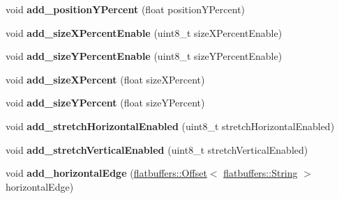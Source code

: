 \begin{DoxyCompactItemize}
\item 
\mbox{\label{structflatbuffers_1_1LayoutComponentTableBuilder_abd7d19f99b737a96a57aceae49f12fbe}} 
void {\bfseries add\+\_\+position\+Y\+Percent} (float position\+Y\+Percent)
\item 
\mbox{\label{structflatbuffers_1_1LayoutComponentTableBuilder_a2535c8654f981da6f901f0518fb7bc49}} 
void {\bfseries add\+\_\+size\+X\+Percent\+Enable} (uint8\+\_\+t size\+X\+Percent\+Enable)
\item 
\mbox{\label{structflatbuffers_1_1LayoutComponentTableBuilder_a4f4e479d2d6c853877d38748edf1cf94}} 
void {\bfseries add\+\_\+size\+Y\+Percent\+Enable} (uint8\+\_\+t size\+Y\+Percent\+Enable)
\item 
\mbox{\label{structflatbuffers_1_1LayoutComponentTableBuilder_a3b6dabe6271d6409d0ef0daeacfba820}} 
void {\bfseries add\+\_\+size\+X\+Percent} (float size\+X\+Percent)
\item 
\mbox{\label{structflatbuffers_1_1LayoutComponentTableBuilder_a88280c4b428c82f0ba8eb1a57093cd2d}} 
void {\bfseries add\+\_\+size\+Y\+Percent} (float size\+Y\+Percent)
\item 
\mbox{\label{structflatbuffers_1_1LayoutComponentTableBuilder_a77836b3399e4634028c04bdde1f626c4}} 
void {\bfseries add\+\_\+stretch\+Horizontal\+Enabled} (uint8\+\_\+t stretch\+Horizontal\+Enabled)
\item 
\mbox{\label{structflatbuffers_1_1LayoutComponentTableBuilder_a0df1cb675e7866e95b3cf8d1f39e8ebb}} 
void {\bfseries add\+\_\+stretch\+Vertical\+Enabled} (uint8\+\_\+t stretch\+Vertical\+Enabled)
\item 
\mbox{\label{structflatbuffers_1_1LayoutComponentTableBuilder_a4141539957b9bba70b52ee7ff581815e}} 
void {\bfseries add\+\_\+horizontal\+Edge} (\hyperlink{structflatbuffers_1_1Offset}{flatbuffers\+::\+Offset}$<$ \hyperlink{structflatbuffers_1_1String}{flatbuffers\+::\+String} $>$ horizontal\+Edge)

\end{DoxyCompactItemize}
